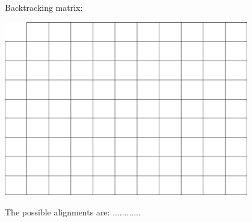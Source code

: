 \documentclass[a4paper,11pt]{article}
\begin{document}
Backtracking matrix:
\begin{center}
\includegraphics[width=0.8\textwidth]{matrix.png}
\end{center}
\vspace{0.5cm}

The possible alignments are: ............
\end{document}
